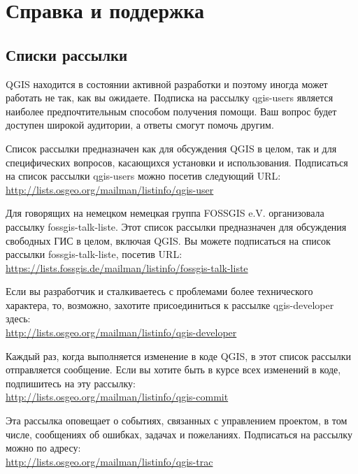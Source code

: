 
\chapter{Справка и поддержка}\label{label_helpsupport}


\section{Списки рассылки}
QGIS находится в состоянии активной разработки и поэтому иногда может
работать не так, как вы ожидаете. Подписка на рассылку qgis-users
является наиболее предпочтительным способом получения помощи. Ваш вопрос
будет доступен широкой аудитории, а ответы смогут помочь другим.

Список рассылки предназначен как для обсуждения QGIS в целом, так и для
специфических вопросов, касающихся установки и использования.
Подписаться на список рассылки qgis-users можно посетив следующий URL: \\
\url{http://lists.osgeo.org/mailman/listinfo/qgis-user}

Для говорящих на немецком немецкая группа FOSSGIS e.V. организовала
рассылку fossgis-talk-liste. Этот список рассылки предназначен для
обсуждения свободных ГИС в целом, включая QGIS. Вы можете подписаться на
список рассылки fossgis-talk-liste, посетив URL: \\
\url{https://lists.fossgis.de/mailman/listinfo/fossgis-talk-liste}

Если вы разработчик и сталкиваетесь с проблемами более технического
характера, то, возможно, захотите присоединиться к рассылке
qgis-developer здесь:\\
\url{http://lists.osgeo.org/mailman/listinfo/qgis-developer}

Каждый раз, когда выполняется изменение в коде QGIS, в этот список
рассылки отправляется сообщение. Если вы хотите быть в курсе всех
изменений в коде, подпишитесь на эту рассылку:\\
\url{http://lists.osgeo.org/mailman/listinfo/qgis-commit}

Эта рассылка оповещает о событиях, связанных с управлением проектом, в
том числе, сообщениях об ошибках, задачах и пожеланиях. Подписаться на
рассылку можно по адресу:\\
\url{http://lists.osgeo.org/mailman/listinfo/qgis-trac}

